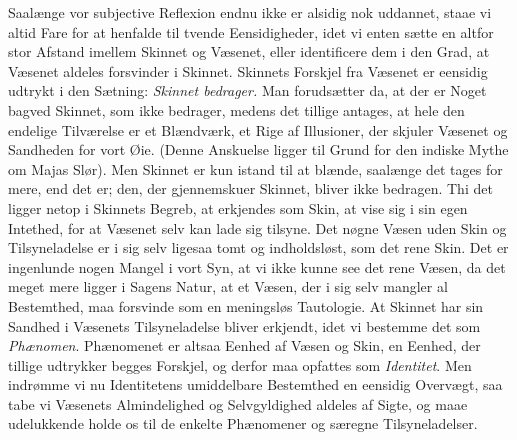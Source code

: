 \documentclass[12pt]{book}
\newcommand{\opage}[1]{\marginnote{\footnotesize\textit{[#1]}}}
\begin{document}
Saalænge vor subjective Reflexion endnu ikke er alsidig nok uddannet, staae vi altid
Fare for at henfalde til tvende Eensidigheder, idet vi enten sætte en altfor stor
Afstand imellem Skinnet og Væsenet, eller identificere dem i den Grad,
\opage{121} %
at Væsenet aldeles forsvinder i Skinnet. Skinnets Forskjel fra Væsenet er eensidig
udtrykt i den Sætning: \emph{Skinnet bedrager.} Man forudsætter da, at der er Noget
bagved Skinnet, som ikke bedrager, medens det tillige antages, at hele den endelige
Tilværelse er et Blændværk, et Rige af Illusioner, der skjuler Væsenet og Sandheden
for vort Øie. (Denne Anskuelse ligger til Grund for den indiske Mythe om Majas Slør).
Men Skinnet er kun istand til at blænde, saalænge det tages for mere, end det er;
den, der gjennemskuer Skinnet, bliver ikke bedragen. Thi det ligger netop i Skinnets
Begreb, at erkjendes som Skin, at vise sig i sin egen Intethed, for at Væsenet selv
kan lade sig tilsyne. Det nøgne Væsen uden Skin og Tilsyneladelse er i sig selv
ligesaa tomt og indholdsløst, som det rene Skin. Det er ingenlunde nogen Mangel i
vort Syn, at vi ikke kunne see det rene Væsen, da det meget mere ligger i Sagens
Natur, at et Væsen, der i sig selv mangler al Bestemthed, maa forsvinde som en
meningsløs Tautologie. At Skinnet har sin Sandhed i Væsenets Tilsyneladelse bliver
erkjendt, idet vi bestemme det som \emph{Phænomen}. Phænomenet er altsaa Eenhed af
Væsen og Skin, en Eenhed, der tillige udtrykker begges Forskjel, og derfor maa
opfattes som \emph{Identitet}. Men indrømme vi nu Identitetens umiddelbare Bestemthed
en eensidig Overvægt, saa tabe vi Væsenets Almindelighed og Selvgyldighed aldeles af
Sigte, og maae udelukkende holde os til de enkelte Phænomener og særegne
Tilsyneladelser.
\end{document}
